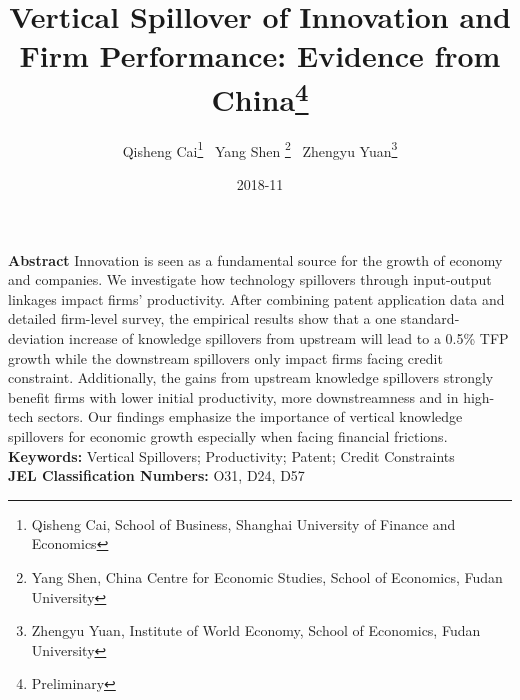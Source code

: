 \documentclass[12pt]{article}%
\begin{document}
\begin{CJK*}{GBK}{fs}

\title{Vertical Spillover of Innovation and Firm Performance: Evidence from China\footnote{Preliminary} \\
\quad \quad \quad \quad \quad \quad \quad \quad \quad \quad \quad \quad \quad \quad
}
\sloppy%

\author{Qisheng Cai\thanks{Qisheng Cai, School of Business, Shanghai University of Finance and Economics} \ Yang Shen \thanks{Yang Shen, China Centre for Economic Studies, School of Economics, Fudan University} \ Zhengyu Yuan\thanks{Zhengyu Yuan, Institute of World Economy, School of Economics, Fudan University}}

\date{2018-11}
\maketitle
\sloppy%
\onehalfspacing
\textbf{Abstract}
Innovation is seen as a fundamental source for the growth of economy and companies. We investigate how technology spillovers through input-output linkages impact firms' productivity. After combining patent application data and detailed firm-level survey, the empirical results show that a one standard-deviation increase of knowledge spillovers from upstream will lead to a 0.5\% TFP growth while the downstream spillovers only impact firms facing credit constraint. Additionally, the gains from upstream knowledge spillovers strongly benefit firms with lower initial productivity, more downstreamness and in high-tech sectors. Our findings emphasize the importance of vertical knowledge spillovers for economic growth especially when facing financial frictions.   \\
\textbf{Keywords:}
Vertical Spillovers; Productivity; Patent; Credit Constraints \\
\textbf{JEL Classification Numbers:} O31, D24, D57
\thispagestyle{empty}
\pagebreak%



\end{CJK*}
\end{document}

